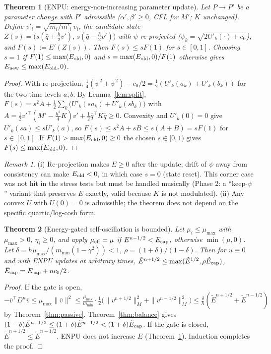 \documentclass[11pt]{article}
\newtheorem{theorem}{Theorem}
\theoremstyle{remark}\newtheorem{remark}{Remark}
\begin{document}
\begin{theorem}[ENPU: energy-non-increasing parameter update]\label{thm:enpu}
Let $P\to P'$ be a parameter change with $P'$ admissible ($\alpha',\beta'\ge0$, CFL for $M'$; $K$ unchanged). Define
$v'_i=\sqrt{m_i/m'_i}\,v_i$, the candidate state $Z(s)=\big(s(\bar q+\tfrac h2v'),\,s(\bar q-\tfrac h2v')\big)$ with $\psi$ re-projected
($\psi_k=\sqrt{2U'_k(\cdot)+c_0}$), and $F(s):=E'(Z(s))$. Then $F(s)\le sF(1)$ for $s\in[0,1]$. Choosing $s=1$ if $F(1)\le\max(E_{\rm old},0)$
and $s=\max(E_{\rm old},0)/F(1)$ otherwise gives $E_{\rm new}\le\max(E_{\rm old},0)$.
\end{theorem}
\begin{proof}
With re-projection, $\tfrac14(\psi^2+\psi^2)-c_0/2=\tfrac12(U'_k(a_k)+U'_k(b_k))$ for the two time levels $a,b$. By Lemma~\ref{lem:split},
$F(s)=s^2A+\tfrac12\sum_k\big(U'_k(sa_k)+U'_k(sb_k)\big)$ with $A=\tfrac12v'^\top(M'-\tfrac{h^2}4K)v'+\tfrac12\bar q^\top K\bar q\ge0$.
Convexity and $U'_k(0)=0$ give $U'_k(sa)\le sU'_k(a)$, so $F(s)\le s^2A+sB\le s(A+B)=sF(1)$ for $s\in[0,1]$. If $F(1)>\max(E_{\rm old},0)\ge0$
the chosen $s\in[0,1)$ gives $F(s)\le\max(E_{\rm old},0)$.
\end{proof}
\begin{remark}
(i) Re-projection makes $E\ge0$ after the update; drift of $\psi$ away from consistency can make $E_{\rm old}<0$, in which case $s=0$ (state reset).
This corner case was not hit in the stress tests but must be handled musically (Phase 2: a ``keep-$\psi$'' variant that preserves $E$ exactly, valid because $K$ is not modulated).
(ii) Any convex $U$ with $U(0)=0$ is admissible; the theorem does not depend on the specific quartic/log-cosh form.
\end{remark}

\begin{theorem}[Energy-gated self-oscillation is bounded]\label{thm:gate}
Let $\mu_i\le\mu_{\max}$ with $\mu_{\max}>0$, $\eta_i\ge0$, and apply $\mu_{\rm eff}=\mu$ if $E^{n-1/2}<E_{\rm cap}$, otherwise $\min(\mu,0)$.
Let $\delta=h\mu_{\max}/(m_{\min}(1-\gamma^2))<1$, $\rho=(1+\delta)/(1-\delta)$. Then for $u\equiv0$ and with ENPU updates at arbitrary times,
$\tilde E^{n+1/2}\le\max(\tilde E^{1/2},\rho\tilde E_{\rm cap})$, $\tilde E_{\rm cap}=E_{\rm cap}+nc_0/2$.
\end{theorem}
\begin{proof}
If the gate is open, $-\bar v^\top D^n\bar v\le\mu_{\max}\|\bar v\|^2\le\frac{\mu_{\max}}{m_{\min}}\cdot\frac12\big(\|v^{n+1/2}\|_M^2+\|v^{n-1/2}\|_M^2\big)\le\frac{\delta}{h}(\tilde E^{n+1/2}+\tilde E^{n-1/2})$
by Theorem~\ref{thm:passive}. Theorem~\ref{thm:balance} gives $(1-\delta)\tilde E^{n+1/2}\le(1+\delta)\tilde E^{n-1/2}<(1+\delta)\tilde E_{\rm cap}$.
If the gate is closed, $\tilde E^{n+1/2}\le\tilde E^{n-1/2}$. ENPU does not increase $E$ (Theorem~\ref{thm:enpu}). Induction completes the proof.
\end{proof}
\end{document}
